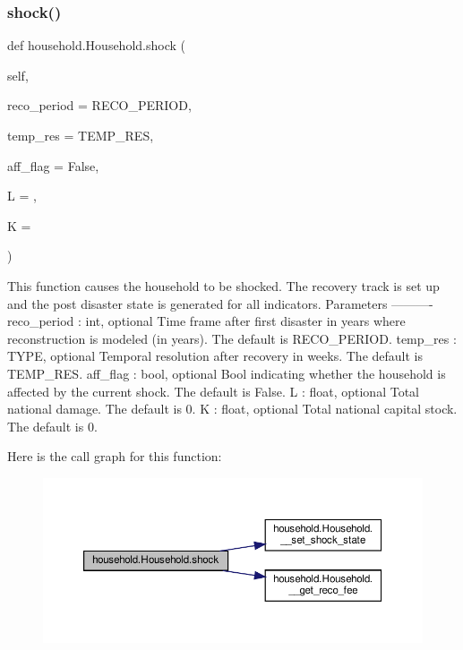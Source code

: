 \subsubsection{\texorpdfstring{shock()}{shock()}}
{\footnotesize\ttfamily def household.\+Household.\+shock (\begin{DoxyParamCaption}\item[{}]{self,  }\item[{}]{reco\+\_\+period = {\ttfamily RECO\+\_\+PERIOD},  }\item[{}]{temp\+\_\+res = {\ttfamily TEMP\+\_\+RES},  }\item[{}]{aff\+\_\+flag = {\ttfamily False},  }\item[{}]{L = {},  }\item[{}]{K = {} }\end{DoxyParamCaption})}

\begin{DoxyVerb}This function causes the household to be shocked. The recovery track is set up and the
   post disaster state is generated for all indicators.
Parameters
----------
reco_period : int, optional
    Time frame after first disaster in years where reconstruction is modeled (in years).
    The default is RECO_PERIOD.
temp_res : TYPE, optional
    Temporal resolution after recovery in weeks. The default is TEMP_RES.
aff_flag : bool, optional
    Bool indicating whether the household is affected by the current shock.
    The default is False.
L : float, optional
    Total national damage. The default is 0.
K : float, optional
    Total national capital stock. The default is 0.
\end{DoxyVerb}
 Here is the call graph for this function\+:\nopagebreak
\begin{figure}[H]
\begin{center}
\leavevmode
\includegraphics[width=350pt]{classhousehold_1_1Household_ab9aa47f8e64ddaf4825c90c1832b3ddd_cgraph}
\end{center}
\end{figure}
\mbox{\label{classhousehold_1_1Household_a96a14035a0b3c03c6cf951251d5f941e}} 

